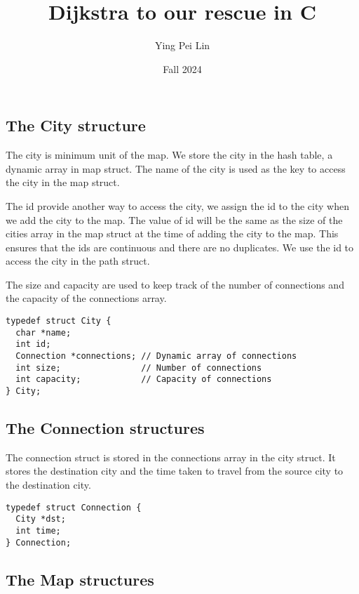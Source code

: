 \documentclass[a4paper,11pt]{article}
\begin{document}
\title{
  \textbf{Dijkstra to our rescue in C}
}
\author{Ying Pei Lin}
\date{Fall 2024}

\maketitle

\subsection*{The City structure}

The city is minimum unit of the map.
We store the city in the hash table, a dynamic array in map struct. The name of the city is
used as the key to access the city in the map struct.

The id provide another way to access the city, we assign the id to the city when we add the 
city to the map. The value of id will be the same as the size of the cities array in the map struct at
the time of adding the city to the map.
This ensures that the ids are continuous and there are no duplicates. 
We use the id to access the city in the path struct. 

The size and capacity are used to keep track of the number of connections and the capacity of the connections array.  

\begin{verbatim}
typedef struct City {
  char *name;
  int id;
  Connection *connections; // Dynamic array of connections
  int size;                // Number of connections
  int capacity;            // Capacity of connections
} City;
\end{verbatim}

\subsection*{The Connection structures}

The connection struct is stored in the connections array in the city struct. 
It stores the destination city and the time taken to travel from the source city to the destination city.

\begin{verbatim}
typedef struct Connection {
  City *dst;
  int time;
} Connection;
\end{verbatim} 
  
\subsection*{The Map structures}
\end{document}
